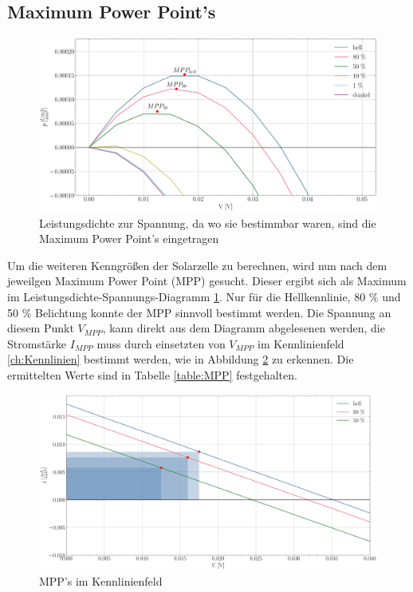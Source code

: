\documentclass[12pt,a4paper,ngerman]{report}
\begin{document}
\subsection{Maximum Power Point's}
\begin{figure} 
	\centering
	\includegraphics[width=\textwidth]{Bilder/MPP.pdf}
	\caption{Leistungsdichte zur Spannung, da wo sie bestimmbar waren, sind die Maximum Power Point's eingetragen}
	\label{img:MPP}
\end{figure}
Um die weiteren Kenngrößen der Solarzelle zu berechnen, wird nun nach dem jeweilgen Maximum Power Point (MPP) gesucht. Dieser ergibt sich als Maximum im Leistungsdichte-Spannungs-Diagramm \ref{img:MPP}. Nur für die Hellkennlinie, 80 \% und 50 \% Belichtung konnte der MPP sinnvoll bestimmt werden. Die Spannung an diesem Punkt $V_{MPP}$, kann direkt aus dem Diagramm abgelesenen werden, die Stromstärke $I_{MPP}$ muss durch einsetzten von $V_{MPP}$ im Kennlinienfeld \ref{ch:Kennlinien} bestimmt werden, wie in Abbildung \ref{img:MPP_Kennlinie} zu erkennen. Die ermittelten Werte sind in Tabelle \ref{table:MPP} festgehalten.
\begin{figure} 
	\centering
	\includegraphics[width=\textwidth]{Bilder/MPP_Kennlinie.pdf}
	\caption{MPP's im Kennlinienfeld}
	\label{img:MPP_Kennlinie}
\end{figure}
\end{document}
